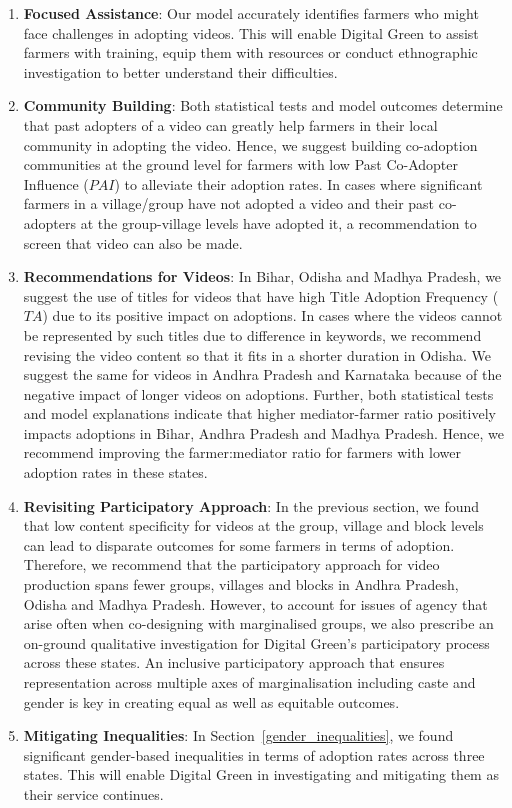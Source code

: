 \documentclass[manuscript,screen]{acmart}
\begin{document}
\begin{enumerate}
\item \textbf{Focused Assistance}: Our model accurately identifies farmers who might face challenges in adopting videos. This will enable Digital Green to assist farmers with training, equip them with resources or conduct ethnographic investigation to better understand their difficulties.

\item \textbf{Community Building}: Both statistical tests and model outcomes determine that past adopters of a video can greatly help farmers in their local community in adopting the video. Hence, we suggest building co-adoption communities at the ground level for farmers with low Past Co-Adopter Influence ($PAI$) to alleviate their adoption rates. In cases where significant farmers in a village/group have not adopted a video and their past co-adopters at the group-village levels have adopted it, a recommendation to screen that video can also be made.

\item \textbf{Recommendations for Videos}: In Bihar, Odisha and Madhya Pradesh, we suggest the use of titles for videos that have high Title Adoption Frequency ($TA$) due to its positive impact on adoptions. In cases where the videos cannot be represented by such titles due to difference in keywords, we recommend revising the video content so that it fits in a shorter duration in Odisha. We suggest the same for videos in Andhra Pradesh and Karnataka because of the negative impact of longer videos on adoptions. Further, both statistical tests and model explanations indicate that higher mediator-farmer ratio positively impacts adoptions in Bihar, Andhra Pradesh and Madhya Pradesh. Hence, we recommend improving the farmer:mediator ratio for farmers with lower adoption rates in these states.

\item \textbf{Revisiting Participatory Approach}: In the previous section, we found that low content specificity for videos at the group, village and block levels can lead to disparate outcomes for some farmers in terms of adoption. Therefore, we recommend that the participatory approach for video production spans fewer groups, villages and blocks in Andhra Pradesh, Odisha and Madhya Pradesh. However, to account for issues of agency that arise often when co-designing with marginalised groups, we also prescribe an on-ground qualitative investigation for Digital Green's participatory process across these states. An inclusive participatory approach that ensures representation across multiple axes of marginalisation including caste and gender is key in creating equal as well as equitable outcomes. 

\item \textbf{Mitigating Inequalities}: In Section~\ref{gender_inequalities}, we found significant gender-based inequalities in terms of adoption rates across three states. This will enable Digital Green in investigating and mitigating them as their service continues. 
\end{enumerate}
\end{document}
